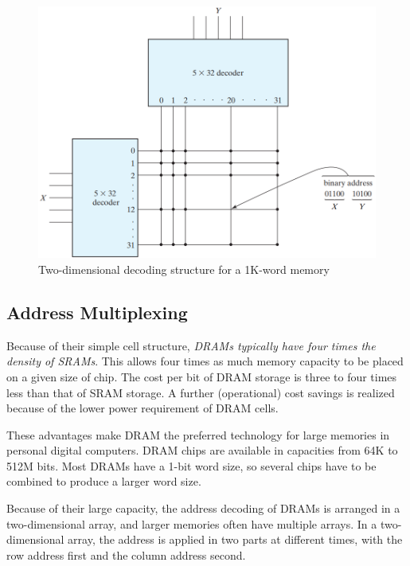 \begin{figure}[H]
  \centering
  \includegraphics[width=\linewidth]{img/fig-7.7.png}
  \caption{Two-dimensional decoding structure for a 1K-word memory}
  \label{fig:7.7}
\end{figure}

\vspace*{\fill}
\columnbreak

\subsection{Address Multiplexing}
\label{subsec:address-multiplexing}

Because of their simple cell structure, \textit{DRAMs typically have four times the density of SRAMs}. This allows four times as much memory capacity to be placed on a given size of chip. The cost per bit of DRAM storage is three to four times less than that of SRAM storage. A further (operational) cost savings is realized because of the lower power requirement of DRAM cells. 

These advantages make DRAM the preferred technology for large memories in personal digital computers. DRAM chips are available in capacities from 64K to 512M bits. Most DRAMs have a 1-bit word size, so several chips have to be combined to produce a larger word size.

Because of their large capacity, the address decoding of DRAMs is arranged in a two-dimensional array, and larger memories often have multiple arrays. In a two-dimensional array, the address is applied in two parts at different times, with the row address first and the column address second.

